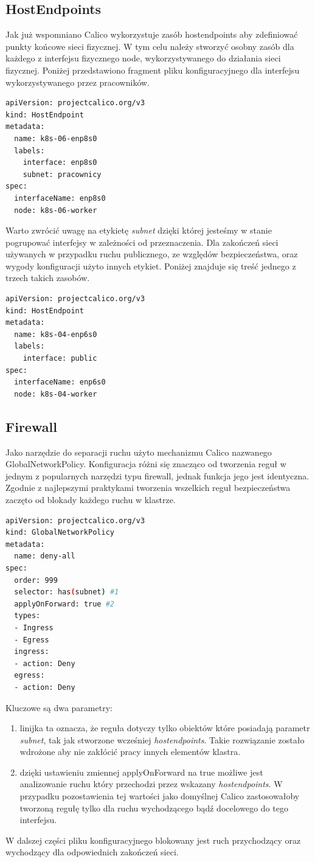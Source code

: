 \documentclass[pl,final,oneside]{mgr} %
\begin{document}
\subsection{HostEndpoints}
Jak już wspomniano Calico wykorzystuje zasób hostendpoints aby zdefiniować punkty końcowe sieci fizycznej. W tym celu należy stworzyć osobny zasób dla każdego z interfejsu fizycznego node, wykorzystywanego do działania sieci fizycznej. Poniżej przedstawiono fragment pliku konfiguracyjnego dla interfejsu wykorzystywanego przez pracowników.

\begin{lstlisting}[language=Bash]
apiVersion: projectcalico.org/v3
kind: HostEndpoint
metadata:
  name: k8s-06-enp8s0
  labels: 
    interface: enp8s0
    subnet: pracownicy
spec:
  interfaceName: enp8s0
  node: k8s-06-worker
\end{lstlisting}
Warto zwrócić uwagę na etykietę \textit{subnet} dzięki której jesteśmy w stanie pogrupować interfejsy w zależności od przeznaczenia. Dla zakończeń sieci używanych w przypadku ruchu publicznego, ze względów bezpieczeństwa, oraz wygody konfiguracji użyto innych etykiet. Poniżej znajduje się treść jednego z trzech takich zasobów.
\begin{lstlisting}[language=Bash]
apiVersion: projectcalico.org/v3
kind: HostEndpoint
metadata:
  name: k8s-04-enp6s0
  labels: 
    interface: public
spec:
  interfaceName: enp6s0
  node: k8s-04-worker
\end{lstlisting}

\subsection{Firewall}
Jako narzędzie do separacji ruchu użyto mechanizmu Calico nazwanego GlobalNetworkPolicy. Konfiguracja różni się znacząco od tworzenia reguł w jednym z popularnych narzędzi typu firewall, jednak funkcja jego jest identyczna. Zgodnie z najlepszymi praktykami tworzenia wszelkich reguł bezpieczeństwa zaczęto od blokady każdego ruchu w klastrze.
\begin{lstlisting}[language=Bash]
apiVersion: projectcalico.org/v3
kind: GlobalNetworkPolicy
metadata:
  name: deny-all
spec:
  order: 999
  selector: has(subnet) #1
  applyOnForward: true #2
  types:
  - Ingress
  - Egress
  ingress:
  - action: Deny
  egress:
  - action: Deny
\end{lstlisting}
Kluczowe są dwa parametry:
\begin{enumerate}
	\item linijka ta oznacza, że reguła dotyczy tylko obiektów które posiadają parametr \textit{subnet}, tak jak stworzone wcześniej \textit{hostendpoints}. Takie rozwiązanie zostało wdrożone aby nie zakłócić pracy innych elementów klastra.
	\item dzięki ustawieniu zmiennej applyOnForward na true możliwe jest analizowanie ruchu który przechodzi przez wskazany \textit{hostendpoints}. W przypadku pozostawienia tej wartości jako domyślnej Calico zastosowałoby tworzoną regułę tylko dla ruchu wychodzącego bądź docelowego do tego interfejsu.
\end{enumerate}
W dalszej części pliku konfiguracyjnego blokowany jest ruch przychodzący oraz wychodzący dla odpowiednich zakończeń sieci.
\end{document}
